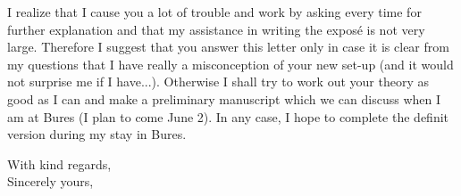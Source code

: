 I realize that I cause you a lot of trouble and work by asking every time for further explanation and that my assistance in writing the exposé is not very large. Therefore I suggest that you answer this letter only in case it is clear from my questions that I have really a misconception of your new set-up (and it would not surprise me if I have...). Otherwise I shall try to work out your theory as good as I can and make a preliminary manuscript which we can discuss when I am at Bures (I plan to come June 2). In any case, I hope to complete the definit version during my stay in Bures.

With kind regards,\\
Sincerely yours,\\
\\
